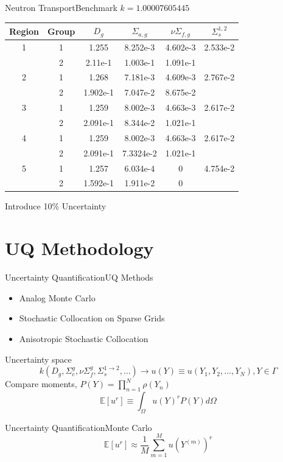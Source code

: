 \documentclass{beamer}
\newcommand{\expv}[1]{\ensuremath{\mathbb{E}[ #1]}}
\begin{document}
\begin{frame}{Neutron Transport}{Benchmark}\vspace{-20pt}
$k=1.00007605445$
\scriptsize
\begin{table}[h]
\centering
\begin{tabular}{c c | c c c c}
Region & Group & $D_g$ & $\Sigma_{a,g}$ & $\nu\Sigma_{f,g}$ & $\Sigma_s^{1,2}$ \\ \hline
1 & 1 & 1.255 & 8.252e-3 & 4.602e-3 & 2.533e-2 \\
 & 2 & 2.11e-1 & 1.003e-1 & 1.091e-1 & \\ \hline
2 & 1 & 1.268 & 7.181e-3 & 4.609e-3 & 2.767e-2 \\
 & 2 & 1.902e-1 & 7.047e-2 & 8.675e-2 & \\ \hline
3 & 1 & 1.259 & 8.002e-3 & 4.663e-3 & 2.617e-2 \\
 & 2 & 2.091e-1 & 8.344e-2 & 1.021e-1 & \\ \hline
4 & 1 & 1.259 & 8.002e-3 & 4.663e-3 & 2.617e-2 \\
 & 2 & 2.091e-1 & 7.3324e-2 & 1.021e-1 & \\ \hline
5 & 1 & 1.257 & 6.034e-4 & 0 & 4.754e-2 \\
 & 2 & 1.592e-1 & 1.911e-2 & 0 & 
\end{tabular}
\end{table}\normalsize
Introduce 10\% Uncertainty
\end{frame}

\section{UQ Methodology}
\begin{frame}{Uncertainty Quantification}{UQ Methods}\vspace{-20pt}
\begin{itemize}
\item Analog Monte Carlo
\item Stochastic Collocation on Sparse Grids
\item Anisotropic Stochastic Collocation
\end{itemize}
Uncertainty space
\[k(D_g,\Sigma_c^g,\nu\Sigma_f^g,\Sigma_s^{1\to2},\ldots) \to u(Y)\equiv u(Y_1,Y_2,\ldots,Y_N),Y\in\Gamma\]%
Compare moments, $P(Y)=\prod_{n=1}^N \rho(Y_n)$
\[\expv{u^r}\equiv\int_\Omega u(Y)^rP(Y)d\Omega\]
\end{frame}

\begin{frame}{Uncertainty Quantification}{Monte Carlo}
\[\expv{u^r}\approx\frac{1}{M}\sum_{m=1}^M u\left(Y^{(m)}\right)^r\]
\end{frame}
\end{document}

